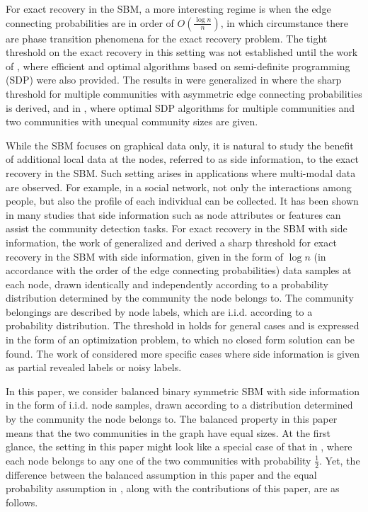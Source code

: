 \documentclass[conference]{IEEEtran}
\begin{document}
	For exact recovery in the SBM, a more interesting regime is when the edge connecting probabilities are in order of $O(\frac{\log n}{n})$, in which circumstance there are phase transition phenomena for the exact recovery problem. 
	The tight threshold on the exact recovery in this setting was not established until the work of \cite{abbe2015exact,mossel2016}, where efficient and optimal algorithms based on semi-definite programming (SDP) were also provided. 
	The results in \cite{abbe2015exact,mossel2016} were generalized in \cite{abbe2015community} where the sharp threshold for multiple communities with asymmetric edge connecting probabilities is derived, and in \cite{Hajek16}, where optimal SDP algorithms for multiple communities and two communities with unequal community sizes are given.
	
	While the SBM focuses on graphical data only, it is natural to study the benefit of additional local data at the nodes, referred to as side information, to the exact recovery in the SBM. Such setting arises in applications where multi-modal data are observed. For example, in a social network, not only the interactions among people, but also the profile of each individual can be collected. It has been shown in many studies that side information such as node attributes or features \cite{zhang2016community,mossel2016local} can assist the community detection tasks. For exact recovery in the SBM with side information, the work of \cite{abbe17sideinfo} generalized \cite{abbe2015community} and derived a sharp threshold for exact recovery in the SBM with side information, given in the form of $\log n$ (in accordance with the order of the edge connecting probabilities) data samples at each node, drawn identically and independently  according to a probability distribution determined by the community the node belongs to. The community belongings are described by node labels, which are i.i.d. according to a probability distribution. 
	The threshold in \cite{abbe17sideinfo} holds for general cases and is expressed in the form of an optimization problem, to which no closed form solution can be found. The work of \cite{esmaeili2019exact,esmaeili2019community,saad2018community} considered more specific cases where side information is given as partial revealed labels or noisy labels.
	
	In this paper, we consider balanced binary symmetric SBM with side information in the form of i.i.d. node samples, drawn according to a distribution determined by the community the node belongs to. The balanced property in this paper means that the two communities in the graph have equal sizes. At the first glance, the setting in this paper might look like a special case of that in \cite{abbe17sideinfo}, where each node belongs to any one of the two communities with probability $\frac{1}{2}$. 
	Yet, 
	the difference between the balanced assumption in this paper and the equal probability assumption in \cite{abbe17sideinfo},  along with the contributions of this paper, are as follows. 
	
\end{document}
